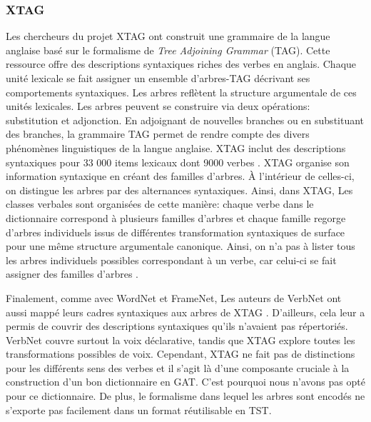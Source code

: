 
\subsubsection{XTAG}
Les chercheurs du projet XTAG ont construit une grammaire de la langue anglaise basé sur le formalisme de \emph{Tree Adjoining Grammar} (TAG). Cette ressource offre des descriptions syntaxiques riches des verbes en anglais. Chaque unité lexicale se fait assigner un ensemble d'arbres-TAG décrivant ses comportements syntaxiques. Les arbres reflètent la structure argumentale de ces unités lexicales. Les arbres peuvent se construire via deux opérations: substitution et adjonction. En adjoignant de nouvelles branches ou en substituant des branches, la grammaire TAG permet de rendre compte des divers phénomènes linguistiques de la langue anglaise. XTAG inclut des descriptions syntaxiques pour 33 000 items lexicaux dont 9000 verbes \citep{ResearchGroupLexicalizedTreeAdjoining2001}. XTAG organise son information syntaxique en créant des familles d'arbres. À l'intérieur de celles-ci, on distingue les arbres par des alternances syntaxiques. Ainsi, dans XTAG, Les classes verbales sont organisées de cette manière: chaque verbe dans le dictionnaire correspond à plusieurs familles d'arbres et chaque famille regorge d'arbres individuels issus de différentes transformation syntaxiques de surface pour une même structure argumentale canonique. Ainsi, on n'a pas à lister tous les arbres individuels possibles correspondant à un verbe, car celui-ci se fait assigner des familles d'arbres \citep{DoranXTAGSystemWide1994}.

Finalement, comme avec WordNet et FrameNet, Les auteurs de VerbNet ont aussi mappé leurs cadres syntaxiques aux arbres de XTAG \citep{W04-3326}.
D'ailleurs, cela leur a permis de couvrir des descriptions syntaxiques qu'ils n'avaient pas répertoriés. VerbNet couvre surtout la voix déclarative, tandis que XTAG explore toutes les transformations possibles de voix. Cependant, XTAG ne fait pas de distinctions pour les différents sens des verbes et il s'agit là d'une composante cruciale à la construction d'un bon dictionnaire en GAT. C'est pourquoi nous n'avons pas opté pour ce dictionnaire. De plus, le formalisme dans lequel les arbres sont encodés ne s'exporte pas facilement dans un format réutilisable en TST.

